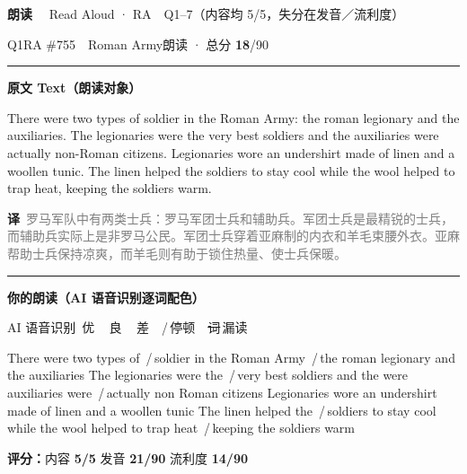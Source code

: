 \documentclass[11pt]{article}
\newcommand{\sfull}[1]{\textcolor{cFix}{\bfseries #1}}     %
\newcommand{\spart}[1]{\textcolor{cPartial}{\bfseries #1}} %
\newcommand{\szero}[1]{\textcolor{cWrong}{\bfseries #1}}   %
\newcommand{\ptesub}[1]{%
  \par\needspace{2\baselineskip}\smallskip
  {\color{cAccent}\rule[-0.2ex]{3pt}{1.05em}}\hspace{6pt}%
  {\bfseries\color{cHead}#1}\par\nopagebreak\smallskip}
\newcommand{\ptetask}[2]{%
  \addcontentsline{toc}{subsection}{#1\ #2}%
  \needspace{4\baselineskip}\medskip
  \begin{tcolorbox}[enhanced, colback=cHead, colframe=cHead, sharp corners,
     left=12pt, right=12pt, top=5pt, bottom=5pt, boxrule=0pt]
    {\large\bfseries\color{white} #1}\ \ {\color{white!80} #2}
  \end{tcolorbox}\smallskip}
\newcommand{\sg}[1]{\textcolor{cSpkGood}{#1}}   %
\newcommand{\sy}[1]{\textcolor{cSpkOk}{#1}}     %
\newcommand{\sr}[1]{\textcolor{cSpkBad}{#1}}    %
\newcommand{\pse}{{\color{gray}\,/\,}}          %
\newcommand{\asrlegend}{{\footnotesize\color{gray}AI 语音识别\quad
  {\color{cSpkGood}\textbullet}\,优\ \ {\color{cSpkOk}\textbullet}\,良\ \
  {\color{cSpkBad}\textbullet}\,差\ \ {\color{gray}/}\,停顿\ \
  {\color{cSpkBad}\sout{词}}\,漏读}}
\newcommand{\zh}[1]{{\footnotesize\textcolor{cNote}{\textbf{译}}\ \textcolor{gray}{#1}}}
\begin{document}
\ptetask{朗读}{Read Aloud · RA　Q1--7（内容均 5/5，失分在发音／流利度）}
\begin{qblock}{Q1\quad RA \#755\ \ Roman Army}{朗读 · 总分 \textcolor{cAccent}{\bfseries 18}/90}
\ptesub{原文 Text（朗读对象）}
\begin{promptbox}
There were two types of soldier in the Roman Army: the roman legionary and the auxiliaries. The legionaries were the very best soldiers and the auxiliaries were actually non-Roman citizens. Legionaries wore an undershirt made of linen and a woollen tunic. The linen helped the soldiers to stay cool while the wool helped to trap heat, keeping the soldiers warm.
\end{promptbox}
\zh{罗马军队中有两类士兵：罗马军团士兵和辅助兵。军团士兵是最精锐的士兵，而辅助兵实际上是非罗马公民。军团士兵穿着亚麻制的内衣和羊毛束腰外衣。亚麻帮助士兵保持凉爽，而羊毛则有助于锁住热量、使士兵保暖。}
\ptesub{你的朗读（AI 语音识别逐词配色）}
\asrlegend
\begin{asrbox}
\sg{There} \sg{were} \sy{two} \sg{types} \sg{of} \pse \sr{soldier} \sg{in} \sg{the} \sg{Roman} \sg{Army} \pse \sg{the} \sr{roman} \sg{legionary} \sg{and} \sg{the} \sg{auxiliaries} \sg{The} \sg{legionaries} \sg{were} \sg{the} \pse \sg{very} \sg{best} \sg{soldiers} \sg{and} \sg{the} \sr{were} \sr{auxiliaries} \sg{were} \pse \sy{actually} \sr{non} \sr{Roman} \sr{citizens} \sr{Legionaries} \sg{wore} \sy{an} \sg{undershirt} \sg{made} \sg{of} \sg{linen} \sy{and} \sy{a} \sr{woollen} \sr{tunic} \sr{The} \sg{linen} \sg{helped} \sg{the} \pse \sg{soldiers} \sy{to} \sg{stay} \sg{cool} \sy{while} \sg{the} \sg{wool} \sy{helped} \sg{to} \sg{trap} \sy{heat} \pse \sr{keeping} \sg{the} \sg{soldiers} \sg{warm}
\end{asrbox}
\smallskip
{\small\textbf{评分：}内容 \sfull{5/5} \quad\textperiodcentered\quad 发音 \spart{21/90} \quad\textperiodcentered\quad 流利度 \szero{14/90}}\quad{\footnotesize\color{gray}（用时 01:08）}
\end{qblock}
\end{document}
